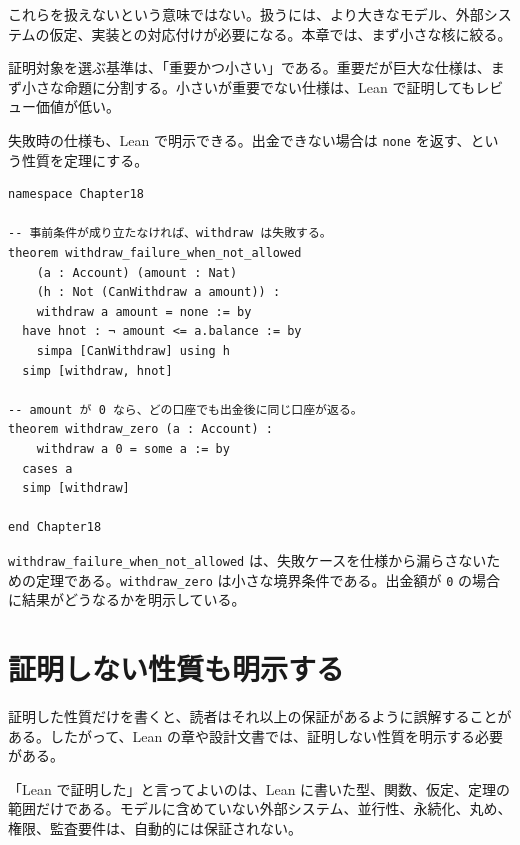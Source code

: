 これらを扱えないという意味ではない。扱うには、より大きなモデル、外部システムの仮定、実装との対応付けが必要になる。本章では、まず小さな核に絞る。

\begin{softwarebox}
証明対象を選ぶ基準は、「重要かつ小さい」である。重要だが巨大な仕様は、まず小さな命題に分割する。小さいが重要でない仕様は、Lean で証明してもレビュー価値が低い。
\end{softwarebox}

失敗時の仕様も、Lean で明示できる。出金できない場合は \texttt{none} を返す、という性質を定理にする。

\begin{listing}[htbp]
\begin{verbatim}
namespace Chapter18

-- 事前条件が成り立たなければ、withdraw は失敗する。
theorem withdraw_failure_when_not_allowed
    (a : Account) (amount : Nat)
    (h : Not (CanWithdraw a amount)) :
    withdraw a amount = none := by
  have hnot : ¬ amount <= a.balance := by
    simpa [CanWithdraw] using h
  simp [withdraw, hnot]

-- amount が 0 なら、どの口座でも出金後に同じ口座が返る。
theorem withdraw_zero (a : Account) :
    withdraw a 0 = some a := by
  cases a
  simp [withdraw]

end Chapter18
\end{verbatim}
\caption{失敗時仕様の定理}
\label{lst:ch18-failure-spec}
\end{listing}

\texttt{withdraw\_failure\_when\_not\_allowed} は、失敗ケースを仕様から漏らさないための定理である。\texttt{withdraw\_zero} は小さな境界条件である。出金額が \texttt{0} の場合に結果がどうなるかを明示している。

\section{証明しない性質も明示する}

証明した性質だけを書くと、読者はそれ以上の保証があるように誤解することがある。したがって、Lean の章や設計文書では、証明しない性質を明示する必要がある。

\begin{warningbox}
「Lean で証明した」と言ってよいのは、Lean に書いた型、関数、仮定、定理の範囲だけである。モデルに含めていない外部システム、並行性、永続化、丸め、権限、監査要件は、自動的には保証されない。
\end{warningbox}

